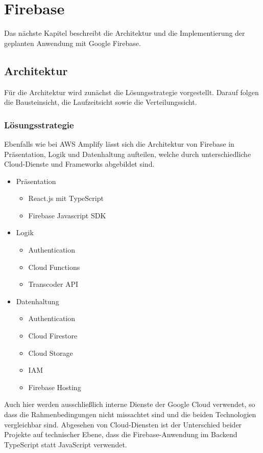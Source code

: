 \chapter{Firebase}

Das nächste Kapitel beschreibt die Architektur und die Implementierung der geplanten Anwendung mit Google Firebase.

\section{Architektur}

Für die Architektur wird zunächst die Lösungsstrategie vorgestellt. Darauf folgen die Bausteinsicht, die Laufzeitsicht sowie die Verteilungssicht.

\subsection{Lösungsstrategie}

Ebenfalls wie bei \ac{AWS} Amplify lässt sich die Architektur von Firebase in Präsentation, Logik und Datenhaltung aufteilen, welche durch unterschiedliche Cloud-Dienste und Frameworks abgebildet sind.
\begin{itemize}
  \item Präsentation
    \begin{itemize}
      \item React.js mit TypeScript
      \item Firebase Javascript SDK
    \end{itemize}
  \item Logik
    \begin{itemize}
      \item Authentication
      \item Cloud Functions
      \item Transcoder API
    \end{itemize}
  \item Datenhaltung
    \begin{itemize}
      \item Authentication
      \item Cloud Firestore
      \item Cloud Storage
      \item IAM
      \item Firebase Hosting
    \end{itemize}
\end{itemize}

Auch hier werden ausschließlich interne Dienste der Google Cloud verwendet, so dass die Rahmenbedingungen nicht missachtet sind und die beiden Technologien vergleichbar sind. Abgesehen von Cloud-Diensten ist der Unterschied beider Projekte auf technischer Ebene, dass die Firebase-Anwendung im Backend TypeScript statt JavaScript verwendet.

